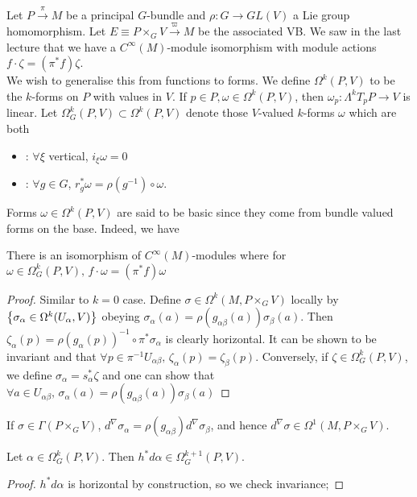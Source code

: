 \documentclass{article}
\begin{document}
Let $P \overset{\pi}{\to} M$ be a principal $G$-bundle and $\rho: G \to GL(V)$ a Lie group homomorphism. Let $E \equiv P \times_G V \overset{\varpi}{\to} M$ be the associated VB. We saw in the last lecture that we have a $C^\infty(M)$-module isomorphism 
with module actions $f \cdot \zeta = (\pi^\ast f) \zeta$. \\
We wish to generalise this from functions to forms. We define $\Omega^k(P,V)$ to be the $k$-forms on $P$ with values in $V$. If $p \in P, \omega \in \Omega^k(P,V)$, then $\omega_p : \Lambda^k T_pP \to V$ is linear. Let $\Omega^k_G(P,V) \subset \Omega^k(P,V)$ denote those $V$-valued $k$-forms $\omega$ which are both 
\begin{itemize}
    \item {}: $\forall \xi$ vertical, $i_\xi \omega = 0$
    \item {}: $\forall g \in G$, $r_g^\ast \omega = \rho(g^{-1}) \circ \omega$. 
\end{itemize} 
Forms $\omega\in \Omega^k(P,V)$ are said to be basic since they come from bundle valued forms on the base. Indeed, we have 
\begin{prop}
There is an isomorphism of $C^\infty(M)$-modules 
where for $\omega \in \Omega^k_G(P,V), \, f \cdot \omega = (\pi^\ast f) \omega$
\end{prop}
\begin{proof}
Similar to $k=0$ case. Define $\sigma \in \Omega^k(M,P\times_G V)$ locally by $\left\{ \sigma_\alpha \in \Omega^k(U_\alpha,V) \right\}$ obeying $\sigma_\alpha(a) = \rho(g_{\alpha\beta}(a)) \sigma_\beta(a)$. Then $\zeta_\alpha(p) = \rho(g_\alpha(p))^{-1} \circ \pi^\ast \sigma_\alpha$ is clearly horizontal. It can be shown to be invariant and that $\forall p \in \pi^{-1} U_{\alpha\beta}, \, \zeta_\alpha(p) = \zeta_\beta(p)$. Conversely, if $\zeta \in \Omega^k_G(P,V)$, we define $\sigma_\alpha = s_\alpha^\ast \zeta$ and one can show that $\forall a \in U_{\alpha\beta}, \, \sigma_\alpha(a) = \rho(g_{\alpha\beta}(a)) \sigma_\beta(a)$ 
\end{proof}

If $\sigma \in \Gamma(P \times_G V)$, $d^\nabla \sigma_\alpha = \rho(g_{\alpha\beta}) d^\nabla \sigma_\beta$, and hence $d^\nabla \sigma \in \Omega^1(M, P\times_G V)$. 

\begin{lemma}
Let $\alpha \in \Omega^k_G(P,V)$. Then $h^\ast d\alpha \in \Omega^{k+1}_G(P,V)$. 
\end{lemma}
\begin{proof}
$h^\ast d\alpha$ is horizontal by construction, so we check invariance; 
\end{proof}
\end{document}
